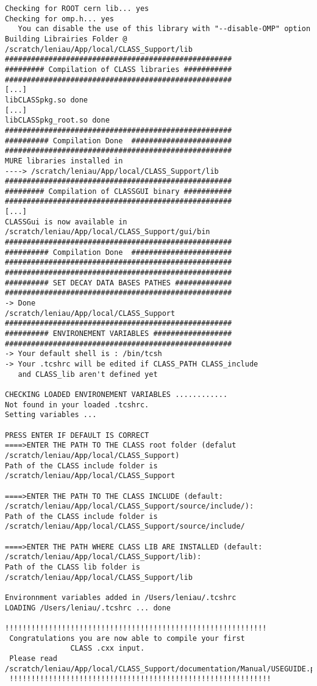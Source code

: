 \begin{center}
\begin{minipage}{\textwidth}
\begin{lstlisting}[style=terminal]
Checking for ROOT cern lib... yes
Checking for omp.h... yes
   You can disable the use of this library with "--disable-OMP" option
Building Librairies Folder @ /scratch/leniau/App/local/CLASS_Support/lib
####################################################
######### Compilation of CLASS libraries ###########
####################################################
[...]
libCLASSpkg.so done
[...]
libCLASSpkg_root.so done
####################################################
########## Compilation Done  #######################
####################################################
MURE libraries installed in
----> /scratch/leniau/App/local/CLASS_Support/lib
####################################################
######### Compilation of CLASSGUI binary ###########
####################################################
[...]
CLASSGui is now available in /scratch/leniau/App/local/CLASS_Support/gui/bin 
####################################################
########## Compilation Done  #######################
####################################################
####################################################
########## SET DECAY DATA BASES PATHES #############
####################################################
-> Done
/scratch/leniau/App/local/CLASS_Support
####################################################
########## ENVIRONEMENT VARIABLES ##################
####################################################
-> Your default shell is : /bin/tcsh
-> Your .tcshrc will be edited if CLASS_PATH CLASS_include
   and CLASS_lib aren't defined yet 

CHECKING LOADED ENVIRONEMENT VARIABLES ............
Not found in your loaded .tcshrc. 
Setting variables ...

PRESS ENTER IF DEFAULT IS CORRECT
====>ENTER THE PATH TO THE CLASS root folder (defalut /scratch/leniau/App/local/CLASS_Support) 
Path of the CLASS include folder is /scratch/leniau/App/local/CLASS_Support

====>ENTER THE PATH TO THE CLASS INCLUDE (default: /scratch/leniau/App/local/CLASS_Support/source/include/): 
Path of the CLASS include folder is /scratch/leniau/App/local/CLASS_Support/source/include/

====>ENTER THE PATH WHERE CLASS LIB ARE INSTALLED (default: /scratch/leniau/App/local/CLASS_Support/lib): 
Path of the CLASS lib folder is /scratch/leniau/App/local/CLASS_Support/lib

Environnment variables added in /Users/leniau/.tcshrc
LOADING /Users/leniau/.tcshrc ... done

!!!!!!!!!!!!!!!!!!!!!!!!!!!!!!!!!!!!!!!!!!!!!!!!!!!!!!!!!!!!
 Congratulations you are now able to compile your first     
               CLASS .cxx input.                            
 Please read /scratch/leniau/App/local/CLASS_Support/documentation/Manual/USEGUIDE.pdf
 !!!!!!!!!!!!!!!!!!!!!!!!!!!!!!!!!!!!!!!!!!!!!!!!!!!!!!!!!!!!
\end{lstlisting}
\end{minipage}
\end{center}

